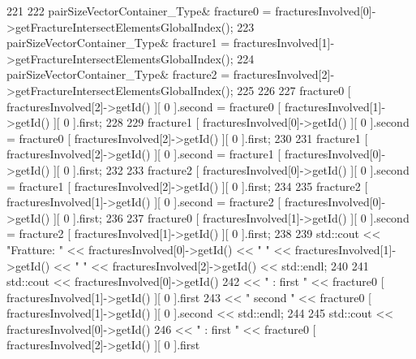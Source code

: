 \begin{DoxyCode}
221 \textcolor{comment}{                }
222 \textcolor{comment}{                pairSizeVectorContainer\_Type& fracture0 =
       fracturesInvolved[0]->getFractureIntersectElementsGlobalIndex();}
223 \textcolor{comment}{                pairSizeVectorContainer\_Type& fracture1 =
       fracturesInvolved[1]->getFractureIntersectElementsGlobalIndex();}
224 \textcolor{comment}{                pairSizeVectorContainer\_Type& fracture2 =
       fracturesInvolved[2]->getFractureIntersectElementsGlobalIndex();}
225 \textcolor{comment}{                }
226 \textcolor{comment}{                }
227 \textcolor{comment}{                fracture0 [ fracturesInvolved[2]->getId() ][ 0 ].second = fracture0 [
       fracturesInvolved[1]->getId() ][ 0 ].first;}
228 \textcolor{comment}{                }
229 \textcolor{comment}{                fracture1 [ fracturesInvolved[0]->getId() ][ 0 ].second = fracture0 [
       fracturesInvolved[2]->getId() ][ 0 ].first;}
230 \textcolor{comment}{                }
231 \textcolor{comment}{                fracture1 [ fracturesInvolved[2]->getId() ][ 0 ].second = fracture1 [
       fracturesInvolved[0]->getId() ][ 0 ].first;}
232 \textcolor{comment}{                }
233 \textcolor{comment}{                fracture2 [ fracturesInvolved[0]->getId() ][ 0 ].second = fracture1 [
       fracturesInvolved[2]->getId() ][ 0 ].first;}
234 \textcolor{comment}{               }
235 \textcolor{comment}{                fracture2 [ fracturesInvolved[1]->getId() ][ 0 ].second = fracture2 [
       fracturesInvolved[0]->getId() ][ 0 ].first;}
236 \textcolor{comment}{                }
237 \textcolor{comment}{                fracture0 [ fracturesInvolved[1]->getId() ][ 0 ].second = fracture2 [
       fracturesInvolved[1]->getId() ][ 0 ].first;}
238 \textcolor{comment}{     }
239 \textcolor{comment}{                std::cout << "Fratture: " << fracturesInvolved[0]->getId() << "     " <<
       fracturesInvolved[1]->getId() << "     " << fracturesInvolved[2]->getId() << std::endl;}
240 \textcolor{comment}{}
241 \textcolor{comment}{                std::cout << fracturesInvolved[0]->getId()}
242 \textcolor{comment}{                                << " :   first " << fracture0 [ fracturesInvolved[1]->getId() ][ 0 ].first}
243 \textcolor{comment}{                                << " second " << fracture0 [ fracturesInvolved[1]->getId() ][ 0 ].second <<
       std::endl;}
244 \textcolor{comment}{    }
245 \textcolor{comment}{                std::cout << fracturesInvolved[0]->getId()}
246 \textcolor{comment}{                                << " :   first " << fracture0 [ fracturesInvolved[2]->getId() ][ 0 ].first}

\end{DoxyCode}
